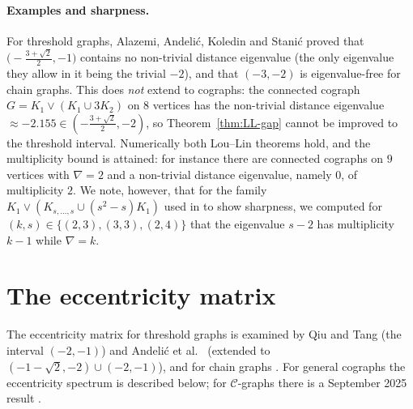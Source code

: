 \documentclass[11pt]{article}
\theoremstyle{plain}
\theoremstyle{definition}
\theoremstyle{remark}
\begin{document}
	\paragraph{Examples and sharpness.} For threshold graphs, Alazemi, Andelić, Koledin and Stanić \cite{AlazemiEtAl2021cograph} proved that $\bigl(-\frac{3+\sqrt2}{2},-1\bigr)$ contains no non-trivial distance eigenvalue (the only eigenvalue they allow in it being the trivial $-2$), and that $(-3,-2)$ is eigenvalue-free for chain graphs. This does \emph{not} extend to cographs: the connected cograph $G=K_1\vee(K_1\cup3K_2)$ on $8$ vertices has the non-trivial distance eigenvalue $\approx-2.155\in(-\tfrac{3+\sqrt2}{2},-2)$, so Theorem~\ref{thm:LL-gap} cannot be improved to the threshold interval. Numerically both Lou--Lin theorems hold, and the multiplicity bound is attained: for instance there are connected cographs on $9$ vertices with $\nabla=2$ and a non-trivial distance eigenvalue, namely $0$, of multiplicity $2$. We note, however, that for the family $K_1\vee(K_{s,\dots,s}\cup(s^2-s)K_1)$ used in \cite{LouLin2020} to show sharpness, we computed for $(k,s)\in\{(2,3),(3,3),(2,4)\}$ that the eigenvalue $s-2$ has multiplicity $k-1$ while $\nabla=k$.
	
	\section{The eccentricity matrix}
	\label{sec:eccentricity}
	\label{sec:cgraph-eccentricity}
	
	The eccentricity matrix for threshold graphs is examined by Qiu and Tang \cite{QiuTang2022} (the interval $(-2,-1)$) and Andelić et al.\ \cite{AndelicEtAl2023} (extended to $(-1-\sqrt2,-2)\cup(-2,-1)$), and for chain graphs \cite{YaqiongXuezheng2025,HuangZhang2025}. For general cographs the eccentricity spectrum is described below; for $\mathcal{C}$-graphs there is a September 2025 result \cite{AshokanEccentricity2025}.
	
\end{document}
